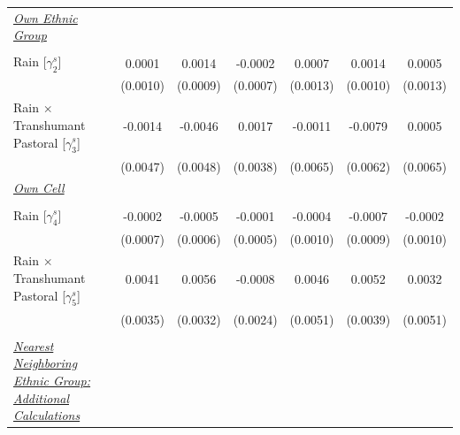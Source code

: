 {\begin{tabular}{l*{6}{c}}
\addlinespace
\underline{\emph{Own Ethnic Group}} \vspace{-0.4cm}&               &               &               &               &               &               \\
                    &               &               &               &               &               &               \\
\addlinespace
\hspace{15pt} Rain [$\gamma^{s}_{2}$]&0.0001         &0.0014         &-0.0002         &0.0007         &0.0014         &0.0005         \\
                    &(0.0010)         &(0.0009)         &(0.0007)         &(0.0013)         &(0.0010)         &(0.0013)         \\
\addlinespace
\hspace{15pt} Rain $\times$ Transhumant Pastoral [$\gamma^{s}_{3}$]&-0.0014         &-0.0046         &0.0017         &-0.0011         &-0.0079         &0.0005         \\
                    &(0.0047)         &(0.0048)         &(0.0038)         &(0.0065)         &(0.0062)         &(0.0065)         \\
\addlinespace
\underline{\emph{Own Cell}} \vspace{-0.4cm}&               &               &               &               &               &               \\
                    &               &               &               &               &               &               \\
\addlinespace
\hspace{15pt} Rain [$\gamma^{s}_{4}$]&-0.0002         &-0.0005         &-0.0001         &-0.0004         &-0.0007         &-0.0002         \\
                    &(0.0007)         &(0.0006)         &(0.0005)         &(0.0010)         &(0.0009)         &(0.0010)         \\
\addlinespace
\hspace{15pt} Rain $\times$ Transhumant Pastoral [$\gamma^{s}_{5}$]&0.0041         &0.0056\sym{*}  &-0.0008         &0.0046         &0.0052         &0.0032         \\
                    &(0.0035)         &(0.0032)         &(0.0024)         &(0.0051)         &(0.0039)         &(0.0051)         \\
\midrule
\\ \underline{\emph{Nearest Neighboring Ethnic Group: Additional Calculations}} &               &               &               &               &               &               \\

\end{tabular}}
